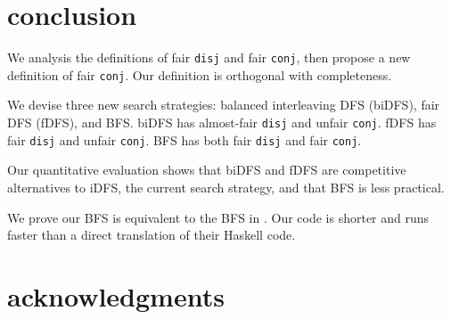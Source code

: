 \documentclass[format=acmlarge, review=true, authordraft=true]{acmart}
\newcommand{\conj}{\texttt{conj}}
\newcommand{\disj}{\texttt{disj}}
\begin{document}
\section{conclusion}

We analysis the definitions of fair \disj{} and fair \conj{}, then propose a 
new definition of fair \conj{}. Our definition is orthogonal with completeness.

We devise three new search strategies: balanced interleaving DFS (biDFS), fair 
DFS (fDFS), and BFS. biDFS has almost-fair \disj{} and unfair \conj{}. fDFS has 
fair \disj{} and unfair \conj{}. BFS has both fair \disj{} and fair \conj{}.

Our quantitative evaluation shows that biDFS and fDFS are competitive 
alternatives to iDFS, the current search strategy, and that BFS is less 
practical.

We prove our BFS is equivalent to the BFS in \citep{seres1999algebra}. Our code 
is shorter and runs faster than a direct translation of their Haskell code.

\section*{acknowledgments}



\end{document}
